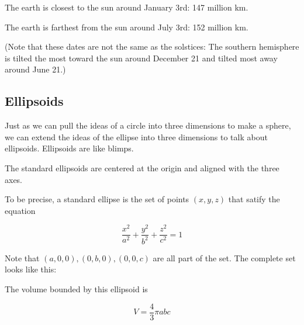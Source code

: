 The earth is closest to the sun around January 3rd: 147 million km.

The earth is farthest from the sun around July 3rd: 152 million km.

(Note that these dates are not the same as the solstices: The southern
hemisphere is tilted the most toward the sun around December 21 and
tilted most away around June 21.)

\subsection{Ellipsoids}

Just as we can pull the ideas of a circle into three dimensions to
make a sphere, we can extend the ideas of the ellipse into three
dimensions to talk about ellipsoids.  Ellipsoids are like blimps.

The standard ellipsoids are centered at the origin and aligned with the three axes.

\begin{mdframed}[style=important, frametitle={Equation for a Standard Ellipsoid}]

To be precise, a standard ellipse is the set of points $(x, y, z)$ that
satify the equation

$$\frac{x^2}{a^2} + \frac{y^2}{b^2} + \frac{z^2}{c^2}= 1$$


Note that $(a,0,0), (0, b,0), (0,0,c)$ are all part of the
set. The complete set looks like this:


  The volume bounded by this ellipsoid is

    $$V = \frac{4}{3} \pi a b c$$


\end{mdframed}

